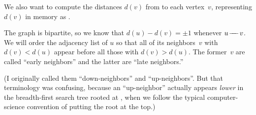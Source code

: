 We also want to compute the distances $d(v)$ from  to
each vertex~$v$, representing $d(v)$ in memory as .

The graph is bipartite, so we know that $d(u)-d(v)=\pm1$ whenever $u\mathrel{\!\mathrel-\mkern-8mu\mathrel-\mkern-8mu\mathrel-\!} v$.
We will order the adjacency list of $u$ so that all of its neighbors~$v$ with
$d(v)<d(u)$ appear before all those with $d(v)>d(u)$. The former~$v$ are
called ``early neighbors'' and the latter are ``late neighbors.''

(I originally called them ``down-neighbors'' and ``up-neighbors''.
But that terminology was confusing, because an
``up-neighbor'' actually appears {\it lower\/} in the breadth-first
search tree rooted at , when we follow the typical
computer-science convention of putting the root at the top.)

